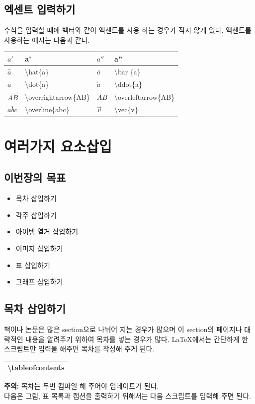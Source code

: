 \documentclass[12pt]{article}
\begin{document}
	\subsection{엑센트 입력하기}
	수식을 입력할 때에 벡터와 같이 엑센트를 사용 하는 경우가 적지 않게 있다. 엑센트를 사용하는 예시는 다음과 같다.\newline
	
	\begin{tabularx}{\textwidth \onehalfspacing}{|l|X||l|X|}
		\hline
		\(a'\) & a' & \(a''\) & a''\\
		\hline
		\(\hat{a} \) & \textbackslash hat\{a\} & \(\bar{a} \) & \textbackslash bar \{a\}\\
		\hline
		\(\dot{a}\) & \textbackslash dot\{a\} & \(\ddot{a}\) &\textbackslash ddot\{a\}\\
		\hline
		\(\overrightarrow{AB}\) & \textbackslash overrightarrow\{AB\} & \(\overleftarrow{AB}\) & \textbackslash overleftarrow\{AB\}\\
		\hline
		\(\overline{abc}\) & \textbackslash overline\{abc\}& \(\vec{v}\) & \textbackslash vec\{v\} \\
		\hline
	\end{tabularx} 
	\clearpage
	\section{여러가지 요소삽입}
	\subsection{이번장의 목표}
	\begin{itemize}
		\item 목차 삽입하기
		\item 각주 삽입하기
		\item 아이템 열거 삽입하기
		\item 이미지 삽입하기
		\item 표 삽입하기
		\item 그래프 삽입하기
	\end{itemize}
	\subsection{목차 삽입하기}
	책이나 논문은 많은 section으로 나뉘어 지는 경우가 많으며 이 section의 페이지나 대략적인 내용을 알려주기 위하여 목차를 넣는 경우가 많다. \LaTeX 에서는 간단하게 한 스크립트만 입력을 해주면 목차를 작성해 주게 된다.\newline
	
	\begin{tabularx}{\textwidth \onehalfspacing}{|X|}
		\hline
		\textbackslash tableofcontents\\
		\hline
	\end{tabularx}
	\newline\newline
	\textbf{주의: }목차는 두번 컴파일 해 주어야 업데이트가 된다.\\
	다음은 그림, 표 목록과 캡션을 출력하기 위해서는 다음 스크립트를 입력해 주면 된다.\newline
	
\end{document}
